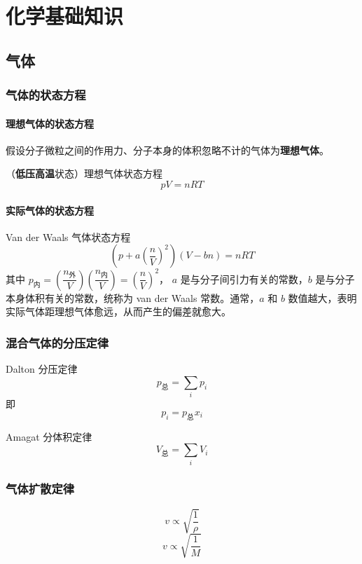 \chapter{化学基础知识}

\section{气体}


\subsection{气体的状态方程}
\subsubsection{理想气体的状态方程}
假设分子微粒之间的作用力、分子本身的体积忽略不计的气体为\textbf{理想气体}。

（\textbf{低压高温}状态）理想气体状态方程 $$\boxed{pV=nRT}$$

\subsubsection{实际气体的状态方程}
Van der Waals 气体状态方程 $$\boxed{\left(p+a\left({\dfrac{n}{V}}\right)^2\right)(V-bn)=nRT}$$其中 $p_{\text{内}}=\left(\dfrac{n_{\text{外}}}{V}\right)\left(\dfrac{n_{\text{内}}}{V}\right)=\left(\dfrac{n}{V}\right)^2$，
$a$ 是与分子间引力有关的常数，$b$ 是与分子本身体积有关的常数，统称为 van der Waals 常数。通常，$a$ 和 $b$ 数值越大，表明实际气体距理想气体愈远，从而产生的偏差就愈大。

\subsection{混合气体的分压定律}
Dalton 分压定律 $$\boxed{p_{\text{总}}=\sum_i p_i}$$即$$\boxed{p_i=p_{\text{总}}x_i}$$

Amagat 分体积定律 $$\boxed{V_{\text{总}}=\sum_i V_i}$$

\subsection{气体扩散定律}
$$\boxed{v \propto \sqrt{\dfrac{1}{\rho}}}$$
$$\boxed{v \propto \sqrt{\dfrac{1}{M}}}$$

